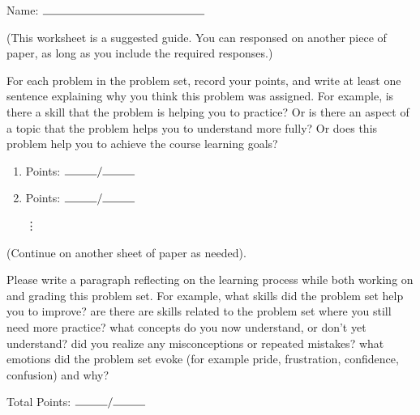 \documentclass[11pt]{article}
\begin{document}

\hfill Name: $\rule{5cm}{.15mm}$


(This worksheet is a suggested guide. You can responsed on another piece of paper, as long as you include the required responses.)

\bigskip
For each problem in the problem set, record your points, and write at least one sentence explaining why you think this problem was assigned. For example, is there a skill that the problem is helping you to practice? Or is there an aspect of a topic that the problem helps you to understand more fully? Or does this problem help you to achieve the course learning goals?
\begin{enumerate}
\item Points: $\rule{1cm}{0.15mm}/\rule{1cm}{0.15mm}$
\vspace{2cm}
\item Points: $\rule{1cm}{0.15mm}/\rule{1cm}{0.15mm}$

\vspace{1cm}
\hspace{2cm} {\Large\vdots}
\end{enumerate}

\vfill
(Continue on another sheet of paper as needed).

\vspace{1cm}

Please write a paragraph reflecting on the learning process while both working on and grading this problem set. For example, what skills did the problem set help you to improve? are there are skills related to the problem set where you still need more practice? what concepts do you now understand, or don't yet understand? did you realize any misconceptions or repeated mistakes? what emotions did the problem set evoke (for example pride, frustration, confidence, confusion) and why?

\vspace{5cm}
\noindent Total Points: $\rule{1cm}{0.15mm}/\rule{1cm}{0.15mm}$
\end{document}

